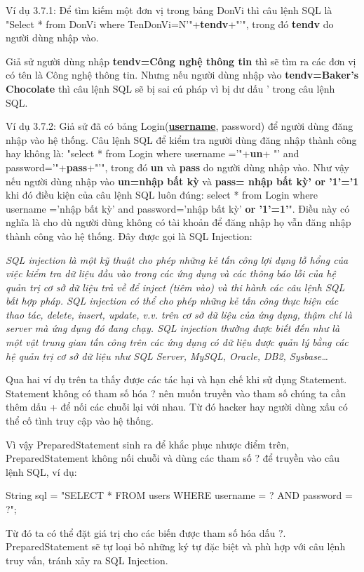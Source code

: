 Ví dụ 3.7.1: Để tìm kiếm một đơn vị trong bảng DonVi thì câu lệnh SQL là "Select * from DonVi where TenDonVi=N'"+\textbf{tendv}+"'", trong đó \textbf{tendv} do người dùng nhập vào.

Giả sử người dùng nhập \textbf{tendv=Công nghệ thông tin} thì sẽ tìm ra các đơn vị có tên là Công nghệ thông tin. Nhưng nếu người dùng nhập vào \textbf{ tendv=Baker's Chocolate }thì câu lệnh SQL sẽ bị sai cú pháp vì bị dư dấu ' trong câu lệnh SQL.

Ví dụ 3.7.2: Giả sử đã có bảng Login(\textbf{\underline{username}}, password) để người dùng đăng nhập vào hệ thống. Câu lệnh SQL để kiểm tra người dùng đăng nhập thành công hay không là: 
"select * from Login where username ='"+\textbf{un}+ "' and password='"+\textbf{pass}+"'", trong đó \textbf{un} và \textbf{pass} do người dùng nhập vào. Như vậy nếu người dùng nhập vào \textbf{un=nhập bất kỳ} và  \textbf{ pass= nhập bất kỳ' or '1'='1 } khi đó điều kiện của câu lệnh SQL  luôn đúng: select * from Login where username ='nhập bất kỳ' and password='nhập bất kỳ'\textbf{ or '1'=1'}". Điều này có nghĩa là cho dù người dùng không có tài khoản để đăng nhập họ vẫn đăng nhập thành công vào hệ thống. Đây được gọi là SQL Injection:

\textit{SQL injection là một kỹ thuật cho phép những kẻ tấn công lợi dụng lỗ hổng của việc kiểm tra dữ liệu đầu vào trong các ứng dụng  và các thông báo lỗi của hệ quản trị cơ sở dữ liệu trả về để inject (tiêm vào) và thi hành các câu lệnh SQL bất hợp pháp. SQL injection có thể cho phép những kẻ tấn công thực hiện các thao tác, delete, insert, update, v.v. trên cơ sở dữ liệu của ứng dụng, thậm chí là server mà ứng dụng đó đang chạy. SQL injection thường được biết đến như là một vật trung gian tấn công trên các ứng dụng  có dữ liệu được quản lý bằng các hệ quản trị cơ sở dữ liệu như SQL Server, MySQL, Oracle, DB2, Sysbase…}

Qua hai ví dụ trên ta thấy được các tác hại và hạn chế khi sử dụng Statement. Statement không có tham số hóa ? nên muốn truyền vào tham số chúng ta cần thêm dấu + để nối các chuỗi lại với nhau. Từ đó hacker hay người dùng xấu có thể cố tình truy cập vào hệ thống.

Vì vậy PreparedStatement sinh ra để khắc phục nhược điểm trên, PreparedStatement không nối chuỗi và dùng các tham số ? để truyền vào câu lệnh SQL, ví dụ:

String sql = "SELECT * FROM users WHERE username = ? AND password =  ?";

Từ đó ta có thể đặt giá trị cho các biến được tham số hóa dấu ?. PreparedStatement sẽ tự loại bỏ những ký tự đặc biệt và phù hợp với câu lệnh truy vấn, tránh xảy ra SQL Injection.

